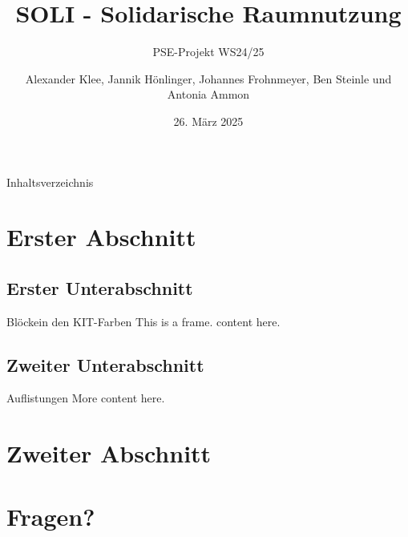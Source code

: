 \documentclass{sdqbeamer}
\title[Solidarische Raumnutzung Qualitätssicherung]{SOLI - Solidarische Raumnutzung} %
\subtitle{PSE-Projekt WS24/25}
\author[]{Alexander Klee, Jannik Hönlinger, Johannes Frohnmeyer, Ben Steinle und Antonia Ammon}
\date[26.\,3.\,2025]{26. März 2025}
\begin{document}
 
\KITtitleframe

\begin{frame}{Inhaltsverzeichnis}
\tableofcontents
\end{frame}

\section{Erster Abschnitt}

\subsection{Erster Unterabschnitt}
\begin{frame}{Blöcke}{in den KIT-Farben}
	This is a frame. content here.
\end{frame}
	  
\subsection{Zweiter Unterabschnitt}
\begin{frame}{Auflistungen}
	More content here.
\end{frame}


\section{Zweiter Abschnitt}

\section{Fragen?}
\end{document}
